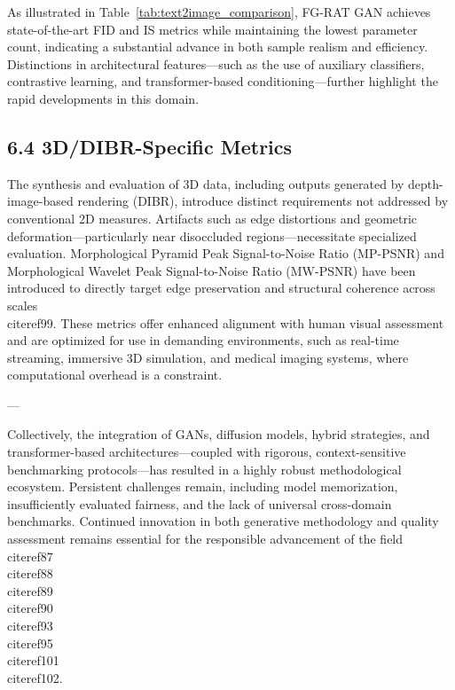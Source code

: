\documentclass[11pt]{article}
\begin{document}
As illustrated in Table~\ref{tab:text2image_comparison}, FG-RAT GAN achieves state-of-the-art FID and IS metrics while maintaining the lowest parameter count, indicating a substantial advance in both sample realism and efficiency. Distinctions in architectural features—such as the use of auxiliary classifiers, contrastive learning, and transformer-based conditioning—further highlight the rapid developments in this domain.

\subsection{6.4 3D/DIBR-Specific Metrics}

The synthesis and evaluation of 3D data, including outputs generated by depth-image-based rendering (DIBR), introduce distinct requirements not addressed by conventional 2D measures. Artifacts such as edge distortions and geometric deformation—particularly near disoccluded regions—necessitate specialized evaluation. Morphological Pyramid Peak Signal-to-Noise Ratio (MP-PSNR) and Morphological Wavelet Peak Signal-to-Noise Ratio (MW-PSNR) have been introduced to directly target edge preservation and structural coherence across scales \\cite{ref99}. These metrics offer enhanced alignment with human visual assessment and are optimized for use in demanding environments, such as real-time streaming, immersive 3D simulation, and medical imaging systems, where computational overhead is a constraint.

---

Collectively, the integration of GANs, diffusion models, hybrid strategies, and transformer-based architectures—coupled with rigorous, context-sensitive benchmarking protocols—has resulted in a highly robust methodological ecosystem. Persistent challenges remain, including model memorization, insufficiently evaluated fairness, and the lack of universal cross-domain benchmarks. Continued innovation in both generative methodology and quality assessment remains essential for the responsible advancement of the field \\cite{ref87}\\cite{ref88}\\cite{ref89}\\cite{ref90}\\cite{ref93}\\cite{ref95}\\cite{ref101}\\cite{ref102}.
\end{document}
